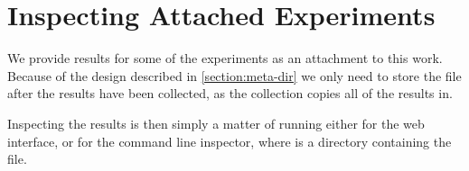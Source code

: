 \section{Inspecting Attached Experiments}

We provide results for some of the experiments as an attachment to this work. Because of the design described in \autoref{section:meta-dir} we only need to store the  file after the results have been collected, as the collection copies all of the results in.

Inspecting the results is then simply a matter of running either  for the web interface, or  for the command line inspector, where  is a directory containing the  file.


